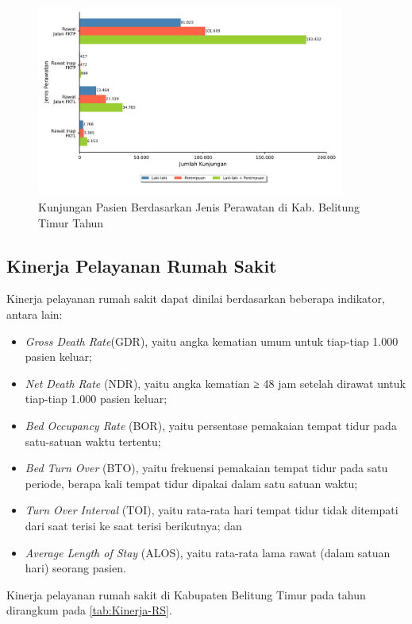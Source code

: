 \begin{figure}[!htb]
    \centering{}
    \includegraphics[width=0.9\textwidth]{bab_02/bab_02_2_rawat}
    \caption{Kunjungan Pasien Berdasarkan Jenis Perawatan di Kab. Belitung Timur Tahun \tP}
    \label{fig:Kunjungan-Rawat}
\end{figure}

\subsection{Kinerja Pelayanan Rumah Sakit}
Kinerja pelayanan rumah sakit dapat dinilai berdasarkan beberapa indikator, antara lain:
\begin{itemize}
 \item \emph{Gross Death Rate}(GDR), yaitu angka kematian umum untuk tiap-tiap 1.000 pasien keluar;
 \item \emph{Net Death Rate} (NDR), yaitu angka kematian ≥ 48 jam setelah dirawat untuk tiap-tiap 1.000 pasien keluar;
 \item \emph{Bed Occupancy Rate} (BOR), yaitu persentase pemakaian tempat tidur pada satu-satuan waktu tertentu;
 \item \emph{Bed Turn Over} (BTO), yaitu frekuensi pemakaian tempat tidur pada satu periode, berapa kali tempat tidur dipakai dalam satu satuan waktu;
 \item \emph{Turn Over Interval} (TOI), yaitu rata-rata hari tempat tidur tidak ditempati dari saat terisi ke saat terisi berikutnya; dan
 \item \emph{Average Length of Stay} (ALOS), yaitu rata-rata lama rawat (dalam satuan hari) seorang pasien.
\end{itemize}

Kinerja pelayanan rumah sakit di Kabupaten Belitung Timur pada tahun \tP dirangkum pada \autoref{tab:Kinerja-RS}.

